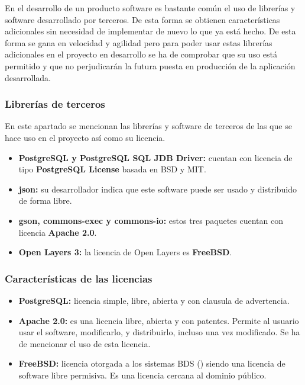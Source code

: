 En el desarrollo de un producto software es bastante común el uso de librerías y software desarrollado por terceros. De esta forma se obtienen características adicionales sin necesidad de implementar de nuevo lo que ya está hecho. De esta forma se gana en velocidad y agilidad pero para poder usar estas librerías adicionales en el proyecto en desarrollo se ha de comprobar que su uso está permitido y que no perjudicarán la futura puesta en producción de la aplicación desarrollada.

\subsubsection{Librerías de terceros}
En este apartado se mencionan las librerías y software de terceros de las que se hace uso en el proyecto así como su licencia.

\begin{itemize}
	\item \textbf{PostgreSQL y PostgreSQL SQL JDB Driver:} cuentan con licencia de tipo \textbf{PostgreSQL License} basada en BSD y MIT.
	\item \textbf{json:} su desarrollador indica que este software puede ser usado y distribuido de forma libre.
	\item \textbf{gson, commons-exec y commons-io:} estos tres paquetes cuentan con licencia \textbf{Apache 2.0}.
	\item \textbf{Open Layers 3:} la licencia de Open Layers es \textbf{FreeBSD}.
\end{itemize}

\subsubsection{Características de las licencias}

\begin{itemize}
	\item \textbf{PostgreSQL:} licencia simple, libre, abierta y con clausula de advertencia.
	\item \textbf{Apache 2.0:} es una licencia libre, abierta y con patentes. Permite al usuario usar el software, modificarlo, y distribuirlo, incluso una vez modificado. Se ha de mencionar el uso de esta licencia.
	\item \textbf{FreeBSD:} licencia otorgada a los sistemas BDS () siendo una licencia de software libre permisiva. Es una licencia cercana al dominio público.
\end{itemize}